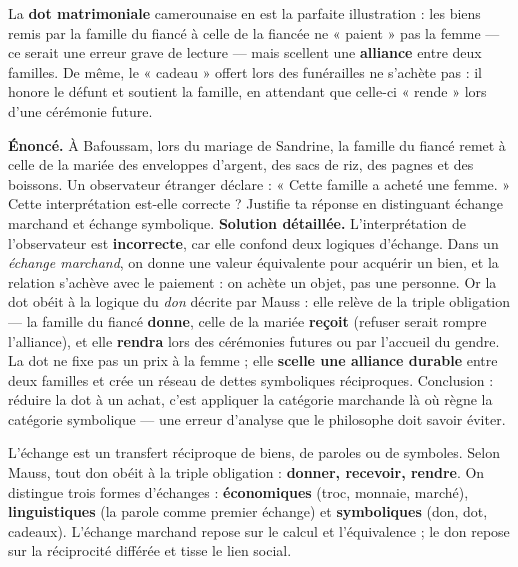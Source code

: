 \documentclass[11pt]{article}
\begin{document}
La \textbf{dot matrimoniale} camerounaise en est la parfaite illustration : les biens remis par la famille du fiancé à celle de la fiancée ne « paient » pas la femme — ce serait une erreur grave de lecture — mais scellent une \textbf{alliance} entre deux familles. De même, le « cadeau » offert lors des funérailles ne s'achète pas : il honore le défunt et soutient la famille, en attendant que celle-ci « rende » lors d'une cérémonie future.

\begin{exoresolu}
\textbf{Énoncé.} À Bafoussam, lors du mariage de Sandrine, la famille du fiancé remet à celle de la mariée des enveloppes d'argent, des sacs de riz, des pagnes et des boissons. Un observateur étranger déclare : « Cette famille a acheté une femme. » Cette interprétation est-elle correcte ? Justifie ta réponse en distinguant échange marchand et échange symbolique.
\tcblower
\textbf{Solution détaillée.} L'interprétation de l'observateur est \textbf{incorrecte}, car elle confond deux logiques d'échange. Dans un \emph{échange marchand}, on donne une valeur équivalente pour acquérir un bien, et la relation s'achève avec le paiement : on achète un objet, pas une personne. Or la dot obéit à la logique du \emph{don} décrite par Mauss : elle relève de la triple obligation — la famille du fiancé \textbf{donne}, celle de la mariée \textbf{reçoit} (refuser serait rompre l'alliance), et elle \textbf{rendra} lors des cérémonies futures ou par l'accueil du gendre. La dot ne fixe pas un prix à la femme ; elle \textbf{scelle une alliance durable} entre deux familles et crée un réseau de dettes symboliques réciproques. Conclusion : réduire la dot à un achat, c'est appliquer la catégorie marchande là où règne la catégorie symbolique — une erreur d'analyse que le philosophe doit savoir éviter.
\end{exoresolu}

\begin{aretenir}[L'essentiel]
L'échange est un transfert réciproque de biens, de paroles ou de symboles. Selon Mauss, tout don obéit à la triple obligation : \textbf{donner, recevoir, rendre}. On distingue trois formes d'échanges : \textbf{économiques} (troc, monnaie, marché), \textbf{linguistiques} (la parole comme premier échange) et \textbf{symboliques} (don, dot, cadeaux). L'échange marchand repose sur le calcul et l'équivalence ; le don repose sur la réciprocité différée et tisse le lien social.
\end{aretenir}
\end{document}

